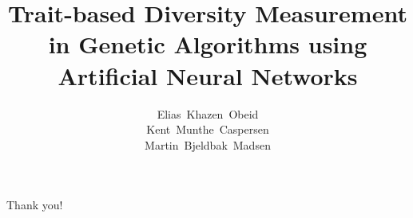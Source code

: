 \documentclass[xcolor=pdftex]{beamer}
\title{Trait-based Diversity Measurement in Genetic Algorithms using Artificial Neural Networks}
\author{%
  Elias~Khazen~Obeid\\
  Kent~Munthe~Caspersen\\
  Martin~Bjeldbak~Madsen
}
\institute{%
  Department of Computer Science\\
  Aalborg University
}
\date{\formatdate{23}{6}{2014}}
\begin{document}
{%
\frame{\titlepage}
}





\begin{frame}[plain,c]
  \begin{center}
    \Huge Thank you!
  \end{center}
\end{frame}
\end{document}
